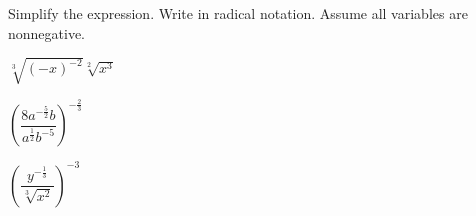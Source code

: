\begin{exercise}Simplify the expression. Write in radical notation. Assume all variables are nonnegative. \\
	\begin{enumerate*}[label={(\arabic*)~}]
		\item $\sqrt[3]{(-x)^{-2}}\sqrt[2]{x^3}$
		\item $\left(\dfrac{8a^{-\frac{5}{2}}b}{a^{\frac12}b^{-5}}\right)^{-\frac23}$
		\item $\left(\dfrac{y^{-\frac{1}{3}}}{\sqrt[3]{x^{2}}}\right)^{-3}$
		\hfill\null
	\end{enumerate*}
\end{exercise}

\vfill
\begin{center} \hfill
\end{center}
